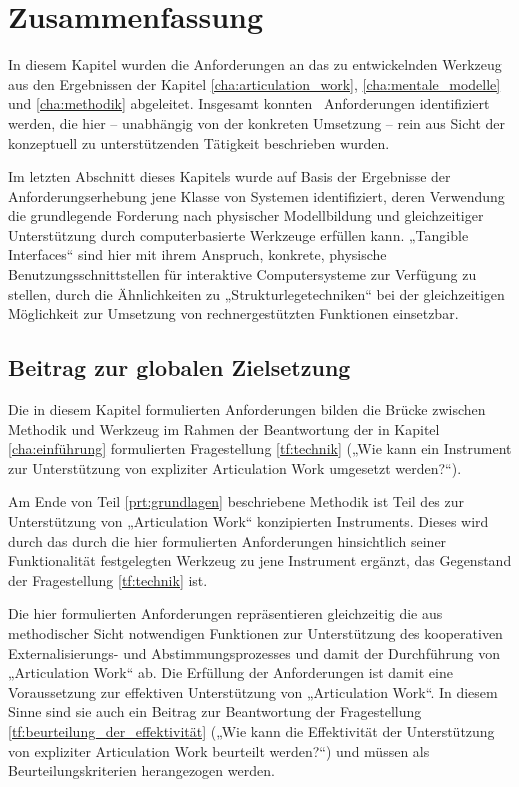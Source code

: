 
\section{Zusammenfassung}
\label{sec:anforderungen_zusammenfassung}

In diesem Kapitel wurden die Anforderungen an das zu entwickelnden Werkzeug aus den Ergebnissen der Kapitel \ref{cha:articulation_work}, \ref{cha:mentale_modelle} und \ref{cha:methodik} abgeleitet. Insgesamt konnten \theanf \ Anforderungen identifiziert werden, die hier -- unabhängig von der konkreten Umsetzung -- rein aus Sicht der konzeptuell zu unterstützenden Tätigkeit beschrieben wurden.

Im letzten Abschnitt dieses Kapitels wurde auf Basis der Ergebnisse der Anforderungserhebung jene Klasse von Systemen identifiziert, deren Verwendung die grundlegende Forderung nach physischer Modellbildung und gleichzeitiger Unterstützung durch computerbasierte Werkzeuge erfüllen kann. „Tangible Interfaces“ sind hier mit ihrem Anspruch, konkrete, physische Benutzungsschnittstellen für interaktive Computersysteme zur Verfügung zu stellen, durch die Ähnlichkeiten zu „Strukturlegetechniken“ bei der gleichzeitigen Möglichkeit zur Umsetzung von rechnergestützten Funktionen einsetzbar.

\subsection{Beitrag zur globalen Zielsetzung}

Die in diesem Kapitel formulierten Anforderungen bilden die Brücke zwischen Methodik und Werkzeug im Rahmen der Beantwortung der in Kapitel \ref{cha:einführung} formulierten Fragestellung \ref{tf:technik} („Wie kann ein Instrument zur Unterstützung von expliziter Articulation Work umgesetzt werden?“).

Am Ende von Teil \ref{prt:grundlagen} beschriebene Methodik ist Teil des zur Unterstützung von „Articulation Work“ konzipierten Instruments. Dieses wird durch das durch die hier formulierten Anforderungen hinsichtlich seiner Funktionalität festgelegten Werkzeug zu jene Instrument ergänzt, das Gegenstand der Fragestellung \ref{tf:technik} ist.

Die hier formulierten Anforderungen repräsentieren gleichzeitig die aus methodischer Sicht notwendigen Funktionen zur Unterstützung des kooperativen Externalisierungs- und Abstimmungsprozesses und damit der Durchführung von „Articulation Work“ ab. Die Erfüllung der Anforderungen ist damit eine Voraussetzung zur effektiven Unterstützung von  „Articulation Work“. In diesem Sinne sind sie auch ein Beitrag zur Beantwortung der Fragestellung \ref{tf:beurteilung_der_effektivität} („Wie kann die Effektivität der Unterstützung von expliziter Articulation Work beurteilt werden?“) und müssen als Beurteilungskriterien herangezogen werden.

